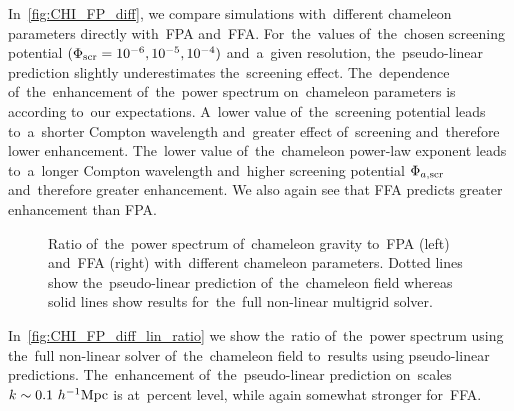 In~\autoref{fig:CHI_FP_diff}, we compare simulations with~different chameleon parameters directly with~FPA and~FFA. For~the~values of~the~chosen screening potential $(\Phi_{\text{\scriptsize scr}}=10^{-6}, 10^{-5}, 10^{-4})$ and~a~given resolution, the~pseudo-linear prediction slightly underestimates the~screening effect. The~dependence of~the~enhancement of~the~power spectrum on~chameleon parameters is according to~our expectations. A~lower value of~the~screening potential leads to~a~shorter Compton wavelength and~greater effect of~screening and~therefore lower enhancement. The~lower value of~the~chameleon power-law exponent leads to~a~longer Compton wavelength and~higher screening potential $\Phi_{a,\text{\scriptsize scr}}$ and~therefore greater enhancement. We also again see that FFA predicts greater enhancement than FPA.

\begin{figure*}[tb]
  \centering
  \chileft
	\begin{subfigure}{1.2\textwidth}
	\end{subfigure}
	\begin{subfigure}{0.5\textwidth}
	\end{subfigure}%
	\begin{subfigure}{0.5\textwidth}
	\end{subfigure}
  \caption{Ratio of~the~power spectrum of~chameleon gravity to~FPA (left) and~FFA (right) with~different chameleon parameters. Dotted lines show the~pseudo-linear prediction of~the~chameleon field whereas solid lines show results for~the~full non-linear multigrid solver.}
  \label{fig:CHI_FP_diff}
\end{figure*}

In~\autoref{fig:CHI_FP_diff_lin_ratio} we show the~ratio of~the~power spectrum using the~full non-linear solver of~the~chameleon field to~results using pseudo-linear predictions. The~enhancement of~the~pseudo-linear prediction on~scales $k\sim0.1~h^{-1}\text{Mpc}$ is at~percent level, while again somewhat stronger for~FFA.

